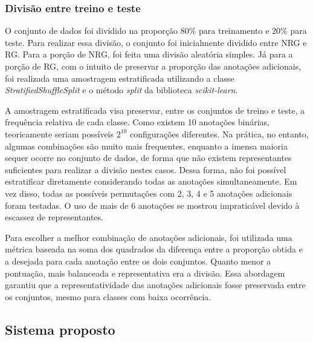 \documentclass[12pt]{article}
\begin{document}
\subsubsection{Divisão entre treino e teste}
\label{sec:dataset:split}


O conjunto de dados foi dividido na proporção 80\% para treinamento e 20\% para teste. Para realizar essa divisão, o conjunto foi inicialmente dividido entre NRG e RG. Para a porção de NRG, foi feita uma divisão aleatória simples. Já para a porção de RG, com o intuito de preservar a proporção das anotações adicionais, foi realizada uma amostragem estratificada utilizando a classe \emph{StratifiedShuffleSplit} e o método \emph{split} da biblioteca \emph{scikit-learn}.

A amostragem estratificada visa preservar, entre os conjuntos de treino e teste, a frequência relativa de cada classe. Como existem 10 anotações binárias, teoricamente seriam possíveis $2^{10}$ configurações diferentes. Na prática, no entanto, algumas combinações são muito mais frequentes, enquanto a imensa maioria sequer ocorre no conjunto de dados, de forma que não existem representantes suficientes para realizar a divisão nestes casos. Dessa forma, não foi possível estratificar diretamente considerando todas as anotações simultaneamente. Em vez disso, todas as possíveis permutações com 2, 3, 4 e 5 anotações adicionais foram testadas. O uso de mais de 6 anotações se mostrou impraticável devido à escassez de representantes.

Para escolher a melhor combinação de anotações adicionais, foi utilizada uma métrica baseada na soma dos quadrados da diferença entre a proporção obtida e a desejada para cada anotação entre os dois conjuntos. Quanto menor a pontuação, mais balanceada e representativa era a divisão. Essa abordagem garantiu que a representatividade das anotações adicionais fosse preservada entre os conjuntos, mesmo para classes com baixa ocorrência.

\subsection{Sistema proposto}
\label{sec:pipeline}
\end{document}
